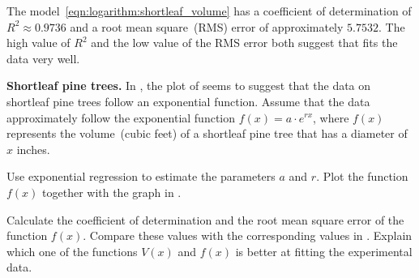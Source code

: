 \documentclass[a4paper,oneside,12pt]{article}
\begin{document}
\begin{solution}
The model~\eqref{eqn:logarithm:shortleaf_volume} has a coefficient of
determination of $R^2 \approx 0.9736$ and a root mean
square~(RMS) error of approximately $5.7532$.  The high value of $R^2$
and the low value of the RMS error both suggest that
 fits the data very well.
\end{solution}

\begin{exercise}
\textbf{Shortleaf pine trees.}
In , the plot of
 seems to suggest that the data
on shortleaf pine trees follow an exponential function.  Assume that
the data approximately follow the exponential function
$f(x) = a \cdot e^{rx}$, where $f(x)$ represents the volume~(cubic
feet) of a shortleaf pine tree that has a diameter of $x$ inches.
\begin{packedenum}
\item\label{subex:logarithm:shortleaf_exponential_regression}
  Use exponential regression to estimate the parameters $a$ and $r$.
  Plot the function $f(x)$ together with the graph in
  .

\item\label{subex:logarithm:shortleaf_exponential_R^2_RMS_error}
  Calculate the coefficient of determination and the root mean square
  error of the function $f(x)$.  Compare these values with the
  corresponding values in .
  Explain which one of the functions $V(x)$ and $f(x)$ is better at
  fitting the experimental data.
\end{packedenum}
\end{exercise}
\end{document}
